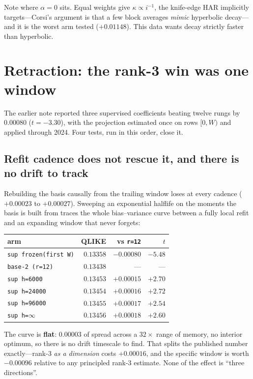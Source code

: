 \documentclass[11pt,a4paper]{article}
\begin{document}
Note where $\alpha=0$ sits. Equal weights give $\kappa \propto i^{-1}$, the
knife-edge HAR implicitly targets---Corsi's argument is that a few block
averages \emph{mimic} hyperbolic decay---and it is the worst arm tested
($+0.01148$). This data wants decay strictly faster than hyperbolic.

\section{Retraction: the rank-3 win was one window}
\label{sec:retraction}

The earlier note reported three supervised coefficients beating twelve rungs by
$0.00080$ ($t=-3.30$), with the projection estimated once on rows $[0,W)$ and
applied through 2024. Four tests, run in this order, close it.

\subsection{Refit cadence does not rescue it, and there is no drift to track}

Rebuilding the basis causally from the trailing window loses at every cadence
($+0.00023$ to $+0.00027$). Sweeping an exponential halflife on the moments the
basis is built from traces the whole bias--variance curve between a fully local
refit and an expanding window that never forgets:

\begin{table}[h]
\centering
\begin{tabular}{lrrr}
\toprule
arm & QLIKE & vs \texttt{r=12} & $t$ \\
\midrule
\texttt{sup frozen(first W)} & $0.13358$ & $-0.00080$ & $-5.48$ \\
\texttt{base-2 (r=12)}       & $0.13438$ & ---        & --- \\
\texttt{sup h=6000}          & $0.13453$ & $+0.00015$ & $+2.70$ \\
\texttt{sup h=24000}         & $0.13454$ & $+0.00016$ & $+2.72$ \\
\texttt{sup h=96000}         & $0.13455$ & $+0.00017$ & $+2.54$ \\
\texttt{sup h=$\infty$}      & $0.13456$ & $+0.00018$ & $+2.60$ \\
\bottomrule
\end{tabular}
\end{table}

\noindent
The curve is \textbf{flat}: $0.00003$ of spread across a $32\times$ range of
memory, no interior optimum, so there is no drift timescale to find. That
splits the published number exactly---rank-3 \emph{as a dimension} costs
$+0.00016$, and the specific window is worth $-0.00096$ relative to any
principled rank-3 estimate. None of the effect is ``three directions''.
\end{document}
